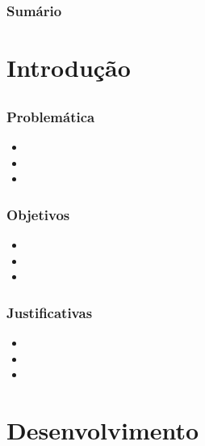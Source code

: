 \documentclass{beamer}
\begin{document}
\begin{frame}
	\frametitle{Sumário}
  	\tableofcontents
\end{frame}


\section{Introdução}
\subsection*{}

\begin{frame}
	\frametitle{Problemática}

	\begin{itemize}
		\item
		\item
		\item
	\end{itemize}
\end{frame}

\begin{frame}
	\frametitle{Objetivos}

	\begin{itemize}
		\item
		\item
		\item
	\end{itemize}
\end{frame}

\begin{frame}
	\frametitle{Justificativas}

	\begin{itemize}
		\item
		\item
		\item
	\end{itemize}
\end{frame}

\section{Desenvolvimento}
\subsection*{}
\end{document}
